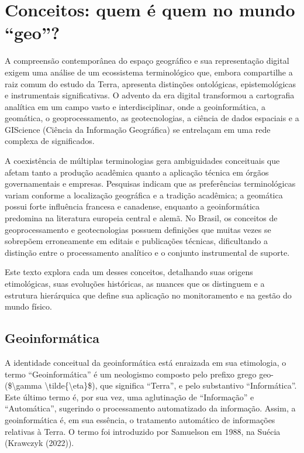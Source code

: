 \documentclass[
  letterpaper,
  DIV=11,
  numbers=noendperiod]{scrreprt}
\begin{document}

\chapter{Conceitos: quem é quem no mundo
``geo''?}\label{conceitos-quem-uxe9-quem-no-mundo-geo}

A compreensão contemporânea do espaço geográfico e sua representação
digital exigem uma análise de um ecossistema terminológico que, embora
compartilhe a raiz comum do estudo da Terra, apresenta distinções
ontológicas, epistemológicas e instrumentais significativas. O advento
da era digital transformou a cartografia analítica em um campo vasto e
interdisciplinar, onde a geoinformática, a geomática, o
geoprocessamento, as geotecnologias, a ciência de dados espaciais e a
GIScience (Ciência da Informação Geográfica) se entrelaçam em uma rede
complexa de significados.

A coexistência de múltiplas terminologias gera ambiguidades conceituais
que afetam tanto a produção acadêmica quanto a aplicação técnica em
órgãos governamentais e empresas. Pesquisas indicam que as preferências
terminológicas variam conforme a localização geográfica e a tradição
acadêmica; a geomática possui forte influência francesa e canadense,
enquanto a geoinformática predomina na literatura europeia central e
alemã. No Brasil, os conceitos de geoprocessamento e geotecnologias
possuem definições que muitas vezes se sobrepõem erroneamente em editais
e publicações técnicas, dificultando a distinção entre o processamento
analítico e o conjunto instrumental de suporte.

Este texto explora cada um desses conceitos, detalhando suas origens
etimológicas, suas evoluções históricas, as nuances que os distinguem e
a estrutura hierárquica que define sua aplicação no monitoramento e na
gestão do mundo físico.

\section{Geoinformática}\label{geoinformuxe1tica}

A identidade conceitual da geoinformática está enraizada em sua
etimologia, o termo ``Geoinformática'' é um neologismo composto pelo
prefixo grego geo- (\$\textbackslash gamma
\textbackslash tilde\{\textbackslash eta\}\$), que significa ``Terra'',
e pelo substantivo ``Informática''. Este último termo é, por sua vez,
uma aglutinação de ``Informação'' e ``Automática'', sugerindo o
processamento automatizado da informação. Assim, a geoinformática é, em
sua essência, o tratamento automático de informações relativas à Terra.
O termo foi introduzido por Samuelson em 1988, na Suécia (Krawczyk
(2022)).
\end{document}
